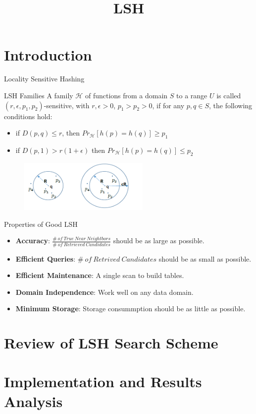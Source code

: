 \documentclass{beamer}
\title{LSH}
\begin{document}
	\maketitle
	\section{Introduction}
	\begin{frame}{Locality Sensitive Hashing}
	\begin{block}{LSH Families}
		A family $\mathcal{H}$ of functions from a domain $S$ to a range $U$ is called $(r, \epsilon, p_1, p_2)$-sensitive, with $r, \epsilon>0$, $p_1>p_2>0$, if for any $p, q\in S$, the following conditions hold:
		\begin{itemize}
			\item if $D(p, q)\leq r$, then $Pr_{\mathcal{H}}[h(p)=h(q)]\geq p_1$
			\item if $D(p, 1)>r(1+\epsilon)$ then $Pr_{\mathcal{H}}[h(p)=h(q)]\leq p_2$
		\end{itemize}
	\end{block}
	\begin{figure}
		\includegraphics[width=2.5in]{figures/intro_lsh.png}
	\end{figure}
	\end{frame}
	
	\begin{frame}{Properties of Good LSH}
	\small
		\begin{itemize}
			\item \textbf{Accuracy}: $\frac{\#\ of\ True\ Near\ Neightbors}{\#\ of\ Retrieved\ Candidates}$ should be as large as possible.
			\vspace{2ex}
			\item\textbf{Efficient Queries}: \small{$\#\ of\ Retrived\ Candidates$} should be as small as possible.
			\vspace{2ex}
			\item \textbf{Efficient Maintenance}: A single scan to build tables.
			\vspace{2ex}
			\item \textbf{Domain Independence}: Work well on any data domain.
			\vspace{2ex}
			\item \textbf{Minimum Storage}: Storage consummption should be as little as possible.
		\end{itemize}
	\end{frame}


	\section{Review of LSH Search Scheme}
	
	
	
	
	\section{Implementation and Results Analysis}
	
	\begin{frame}[allowframebreaks]
	
	
	\end{frame}
\end{document}
